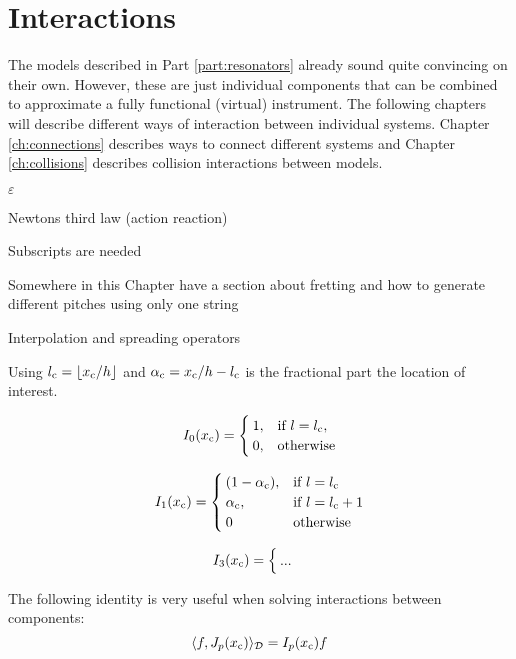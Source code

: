 \chapter*{Interactions}
\renewcommand\theequation{\Roman{part}.\arabic{equation}}

The models described in Part \ref{part:resonators} already sound quite convincing on their own. However, these are just individual components that can be combined to approximate a fully functional (virtual) instrument. The following chapters will describe different ways of interaction between individual systems. Chapter \ref{ch:connections} describes ways to connect different systems and Chapter \ref{ch:collisions} describes collision interactions between models. 

$\varepsilon$

Newtons third law (action reaction)

Subscripts are needed

Somewhere in this Chapter have a section about fretting and how to generate different pitches using only one string

Interpolation and spreading operators

Using $l_\ctxt = \floor[x_\ctxt / h]$ and $\alpha_{\text{c}} = x_{\text{c}} / h - l_{\text{c}}$ is the fractional part the location of interest.
 
\begin{equation}
    I_0(x_{\text{c}}) = \begin{cases}
        1, & \text{if}\ l = l_{\text{c}},\\
        0, & \text{otherwise}
    \end{cases}
\end{equation}

\begin{equation}
    I_1(x_{\text{c}}) = \begin{cases}
        (1-\alpha_{\text{c}}), & \text{if}\ l = l_{\text{c}}\\
        \alpha_{\text{c}} , & \text{if}\ l = l_{\text{c}} + 1\\
        0 & \text{otherwise}
    \end{cases}
\end{equation}

\begin{equation}
    I_3(x_{\text{c}}) = \begin{cases}
        ...
    \end{cases}
\end{equation}

The following identity is very useful when solving interactions between components:
\begin{equation}\label{eq:identityIJ}
    \langle f, J_p(x_{\text{c}}) \rangle_{\mathcal{D}} = I_p(x_{\text{c}}) f
\end{equation}
\renewcommand\theequation{\arabic{chapter}.\arabic{equation}}
